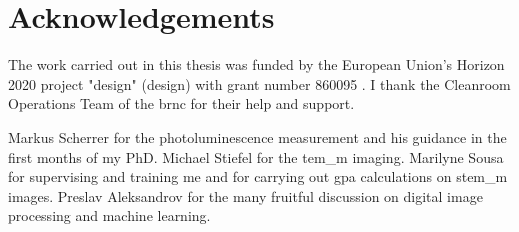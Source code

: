 \chapter{Acknowledgements}

The work carried out in this thesis was funded by the European Union's Horizon 2020 project "\acl{design}" (\acs{design}) with grant number 860095 \cite{CordisDESIGN}. I thank the Cleanroom Operations Team of the \acl{brnc} for their help and support. 

Markus Scherrer for the photoluminescence measurement and his guidance in the first months of my PhD. 
Michael Stiefel for the \acs{tem_m} imaging. 
Marilyne Sousa for supervising and training me and for carrying out \acs{gpa} calculations on \acs{stem_m} images. 
Preslav Aleksandrov for the many fruitful discussion on digital image processing and machine learning.